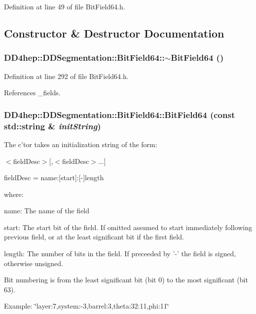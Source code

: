 Definition at line 49 of file BitField64.h.

\subsection{Constructor \& Destructor Documentation}
\hypertarget{class_d_d4hep_1_1_d_d_segmentation_1_1_bit_field64_a8a82f357f0409ed81727b4de29590b95}{
\subsubsection[{$\sim$BitField64}]{\setlength{\rightskip}{0pt plus 5cm}DD4hep::DDSegmentation::BitField64::$\sim$BitField64 ()}}
\label{class_d_d4hep_1_1_d_d_segmentation_1_1_bit_field64_a8a82f357f0409ed81727b4de29590b95}


Definition at line 292 of file BitField64.h.

References \_\-fields.\hypertarget{class_d_d4hep_1_1_d_d_segmentation_1_1_bit_field64_aa958402b4d1f8d79cf716397b9b642e4}{
\subsubsection[{BitField64}]{\setlength{\rightskip}{0pt plus 5cm}DD4hep::DDSegmentation::BitField64::BitField64 (const std::string \& {\em initString})}}
\label{class_d_d4hep_1_1_d_d_segmentation_1_1_bit_field64_aa958402b4d1f8d79cf716397b9b642e4}
The c'tor takes an initialization string of the form:\par
 $<$fieldDesc$>$\mbox{[},$<$fieldDesc$>$...\mbox{]}\par
 fieldDesc = name:\mbox{[}start\mbox{]}:\mbox{[}-\/\mbox{]}length\par
 where:\par
 name: The name of the field\par
 start: The start bit of the field. If omitted assumed to start immediately following previous field, or at the least significant bit if the first field.\par
 length: The number of bits in the field. If preceeded by '-\/' the field is signed, otherwise unsigned.\par
 Bit numbering is from the least significant bit (bit 0) to the most significant (bit 63). \par
 Example: \char`\"{}layer:7,system:-\/3,barrel:3,theta:32:11,phi:11\char`\"{} 

